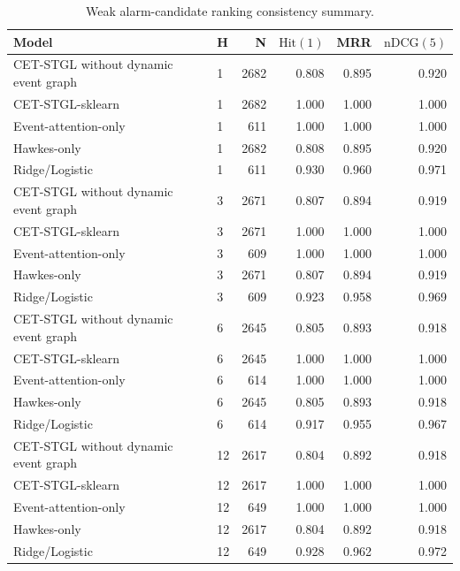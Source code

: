 \begin{table}[t]
\centering
\caption{Weak alarm-candidate ranking consistency summary.}
\label{tab:ranking_main}
\scriptsize
\setlength{\tabcolsep}{4pt}
\begin{tabular}{llrrrr}
\toprule
Model & H & N & $\mathrm{Hit}(1)$ & MRR & $\mathrm{nDCG}(5)$ \\
\midrule
CET-STGL without dynamic event graph & 1 & 2682 & 0.808 & 0.895 & 0.920 \\
CET-STGL-sklearn & 1 & 2682 & 1.000 & 1.000 & 1.000 \\
Event-attention-only & 1 & 611 & 1.000 & 1.000 & 1.000 \\
Hawkes-only & 1 & 2682 & 0.808 & 0.895 & 0.920 \\
Ridge/Logistic & 1 & 611 & 0.930 & 0.960 & 0.971 \\
CET-STGL without dynamic event graph & 3 & 2671 & 0.807 & 0.894 & 0.919 \\
CET-STGL-sklearn & 3 & 2671 & 1.000 & 1.000 & 1.000 \\
Event-attention-only & 3 & 609 & 1.000 & 1.000 & 1.000 \\
Hawkes-only & 3 & 2671 & 0.807 & 0.894 & 0.919 \\
Ridge/Logistic & 3 & 609 & 0.923 & 0.958 & 0.969 \\
CET-STGL without dynamic event graph & 6 & 2645 & 0.805 & 0.893 & 0.918 \\
CET-STGL-sklearn & 6 & 2645 & 1.000 & 1.000 & 1.000 \\
Event-attention-only & 6 & 614 & 1.000 & 1.000 & 1.000 \\
Hawkes-only & 6 & 2645 & 0.805 & 0.893 & 0.918 \\
Ridge/Logistic & 6 & 614 & 0.917 & 0.955 & 0.967 \\
CET-STGL without dynamic event graph & 12 & 2617 & 0.804 & 0.892 & 0.918 \\
CET-STGL-sklearn & 12 & 2617 & 1.000 & 1.000 & 1.000 \\
Event-attention-only & 12 & 649 & 1.000 & 1.000 & 1.000 \\
Hawkes-only & 12 & 2617 & 0.804 & 0.892 & 0.918 \\
Ridge/Logistic & 12 & 649 & 0.928 & 0.962 & 0.972 \\
\bottomrule
\end{tabular}

\end{table}
